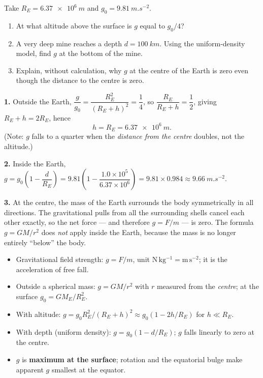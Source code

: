 \documentclass[11pt]{article}
\begin{document}
\begin{exercice}[Variation of $g$]
Take $R_{E} = \SI{6.37e6}{m}$ and $g_{0} = \SI{9.81}{m.s^{-2}}$.
\begin{enumerate}
\item At what altitude above the surface is $g$ equal to $g_{0}/4$?
\item A very deep mine reaches a depth $d = \SI{100}{km}$. Using the uniform-density model, find $g$ at the bottom of the mine.
\item Explain, without calculation, why $g$ at the centre of the Earth is zero even though the distance to the centre is zero.
\end{enumerate}
\end{exercice}

\begin{corrige}[Exercise 1]
\textbf{1.} Outside the Earth, $\dfrac{g}{g_{0}} = \dfrac{R_{E}^{2}}{(R_{E}+h)^{2}} = \dfrac{1}{4}$, so $\dfrac{R_{E}}{R_{E}+h} = \dfrac{1}{2}$, giving $R_{E} + h = 2R_{E}$, hence
\[
h = R_{E} = \SI{6.37e6}{m}.
\]
(Note: $g$ falls to a quarter when the \emph{distance from the centre} doubles, not the altitude.)

\textbf{2.} Inside the Earth, $g = g_{0}\left(1 - \dfrac{d}{R_{E}}\right) = 9.81\left(1 - \dfrac{1.0\times10^{5}}{6.37\times10^{6}}\right) = 9.81 \times 0.984 \approx \SI{9.66}{m.s^{-2}}$.

\textbf{3.} At the centre, the mass of the Earth surrounds the body symmetrically in all directions. The gravitational pulls from all the surrounding shells cancel each other exactly, so the net force --- and therefore $g = F/m$ --- is zero. The formula $g = GM/r^{2}$ does \emph{not} apply inside the Earth, because the mass is no longer entirely ``below'' the body.
\end{corrige}

\begin{aretenir}
\begin{itemize}
\item Gravitational field strength: $g = F/m$, unit $\mathrm{N\,kg^{-1}} = \mathrm{m\,s^{-2}}$; it is the acceleration of free fall.
\item Outside a spherical mass: $g = GM/r^{2}$ with $r$ measured from the \emph{centre}; at the surface $g_{0} = GM_{E}/R_{E}^{2}$.
\item With altitude: $g = g_{0}R_{E}^{2}/(R_{E}+h)^{2} \approx g_{0}(1 - 2h/R_{E})$ for $h \ll R_{E}$.
\item With depth (uniform density): $g = g_{0}(1 - d/R_{E})$; $g$ falls linearly to zero at the centre.
\item $g$ is \textbf{maximum at the surface}; rotation and the equatorial bulge make apparent $g$ smallest at the equator.
\end{itemize}
\end{aretenir}
\end{document}
